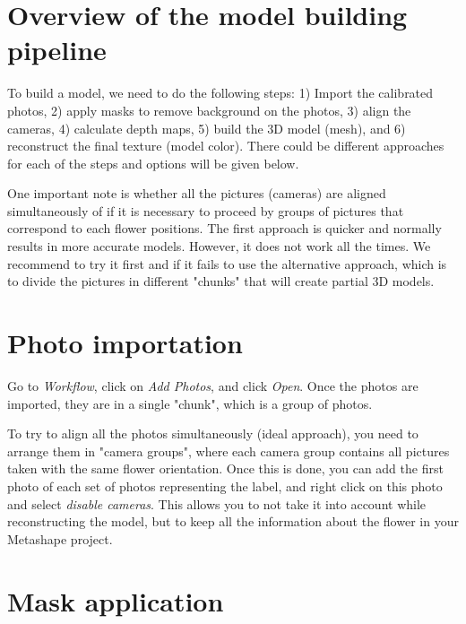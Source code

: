 \documentclass[
]{book}
\begin{document}
\hypertarget{overview-of-the-model-building-pipeline}{%
\section{Overview of the model building pipeline}\label{overview-of-the-model-building-pipeline}}

To build a model, we need to do the following steps: 1) Import the
calibrated photos, 2) apply masks to remove background on the photos, 3)
align the cameras, 4) calculate depth maps, 5) build the 3D model
(mesh), and 6) reconstruct the final texture (model color). There could
be different approaches for each of the steps and options will be given
below.

One important note is whether all the pictures (cameras) are aligned
simultaneously of if it is necessary to proceed by groups of pictures
that correspond to each flower positions. The first approach is quicker
and normally results in more accurate models. However, it does not work
all the times. We recommend to try it first and if it fails to use the
alternative approach, which is to divide the pictures in different
"chunks" that will create partial 3D models.

\hypertarget{photo-importation}{%
\section{Photo importation}\label{photo-importation}}

Go to \emph{Workflow}, click on \emph{Add Photos}, and click \emph{Open}. Once the
photos are imported, they are in a single "chunk", which is a group of
photos.

To try to align all the photos simultaneously (ideal approach), you need
to arrange them in "camera groups", where each camera group contains
all pictures taken with the same flower orientation. Once this is done,
you can add the first photo of each set of photos representing the
label, and right click on this photo and select \emph{disable cameras}. This
allows you to not take it into account while reconstructing the model,
but to keep all the information about the flower in your Metashape
project.

\hypertarget{mask-application}{%
\section{Mask application}\label{mask-application}}
\end{document}
